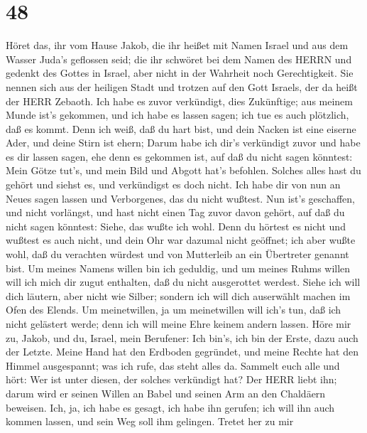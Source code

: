 \hypertarget{section-47}{%
\section{48}\label{section-47}}

 Höret das, ihr vom Hause Jakob, die ihr heißet mit Namen
Israel und aus dem Wasser Juda's geflossen seid; die ihr schwöret bei
dem Namen des HERRN und gedenkt des Gottes in Israel, aber nicht in der
Wahrheit noch Gerechtigkeit.  Sie nennen sich aus der
heiligen Stadt und trotzen auf den Gott Israels, der da heißt der HERR
Zebaoth.  Ich habe es zuvor verkündigt, dies Zukünftige; aus
meinem Munde ist's gekommen, und ich habe es lassen sagen; ich tue es
auch plötzlich, daß es kommt.  Denn ich weiß, daß du hart
bist, und dein Nacken ist eine eiserne Ader, und deine Stirn ist ehern;
 Darum habe ich dir's verkündigt zuvor und habe es dir
lassen sagen, ehe denn es gekommen ist, auf daß du nicht sagen könntest:
Mein Götze tut's, und mein Bild und Abgott hat's befohlen. 
Solches alles hast du gehört und siehst es, und verkündigst es doch
nicht. Ich habe dir von nun an Neues sagen lassen und Verborgenes, das
du nicht wußtest.  Nun ist's geschaffen, und nicht
vorlängst, und hast nicht einen Tag zuvor davon gehört, auf daß du nicht
sagen könntest: Siehe, das wußte ich wohl.  Denn du hörtest
es nicht und wußtest es auch nicht, und dein Ohr war dazumal nicht
geöffnet; ich aber wußte wohl, daß du verachten würdest und von
Mutterleib an ein Übertreter genannt bist.  Um meines Namens
willen bin ich geduldig, und um meines Ruhms willen will ich mich dir
zugut enthalten, daß du nicht ausgerottet werdest.  Siehe
ich will dich läutern, aber nicht wie Silber; sondern ich will dich
auserwählt machen im Ofen des Elends.  Um meinetwillen, ja
um meinetwillen will ich's tun, daß ich nicht gelästert werde; denn ich
will meine Ehre keinem andern lassen.  Höre mir zu, Jakob,
und du, Israel, mein Berufener: Ich bin's, ich bin der Erste, dazu auch
der Letzte.  Meine Hand hat den Erdboden gegründet, und
meine Rechte hat den Himmel ausgespannt; was ich rufe, das steht alles
da.  Sammelt euch alle und hört: Wer ist unter diesen, der
solches verkündigt hat? Der HERR liebt ihn; darum wird er seinen Willen
an Babel und seinen Arm an den Chaldäern beweisen.  Ich,
ja, ich habe es gesagt, ich habe ihn gerufen; ich will ihn auch kommen
lassen, und sein Weg soll ihm gelingen.  Tretet her zu mir
